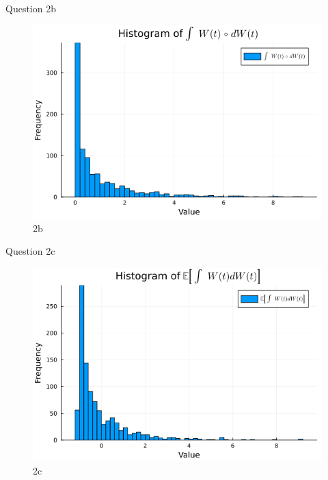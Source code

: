 \documentclass[compress,12pt]{beamer}
\begin{document}
\begin{frame}{Question 2b}
      \begin{figure}[H]
            \centering
            \includegraphics[scale=0.5]{imgs/2b.png}
            \caption{2b}
            \label{fig:2b}
      \end{figure}
\end{frame}

\begin{frame}{Question 2c}
      \begin{figure}[H]
            \centering
            \includegraphics[scale=0.5]{imgs/2c.png}
            \caption{2c}
            \label{fig:2c}
      \end{figure}
\end{frame}
\end{document}
